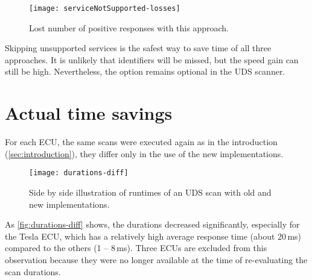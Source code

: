 \begin{figure}[htb]
    \centering
    \texttt{[image: serviceNotSupported-losses]}
    \caption{Lost number of positive responses with this approach.}
    \label{fig:serviceNotSupported-losses}
\end{figure}

Skipping unsupported services is the safest way to save time of all three approaches. It is unlikely that identifiers will be missed, but the speed gain can still be high. Nevertheless, the option remains optional in the UDS scanner.

\section{Actual time savings}

For each ECU, the same scans were executed again as in the introduction (\autoref{sec:introduction}), they differ only in the use of the new implementations.

\begin{figure}[htb]
    \centering
    \texttt{[image: durations-diff]}
    \caption{Side by side illustration of runtimes of an UDS scan with old and new implementations.}
    \label{fig:durations-diff}
\end{figure}

As \autoref{fig:durations-diff} shows, the durations decreased significantly, especially for the Tesla ECU, which has a relatively high average response time (about 20\,ms) compared to the others (1 – 8\,ms).
Three ECUs are excluded from this observation because they were no longer available at the time of re-evaluating the scan durations.
